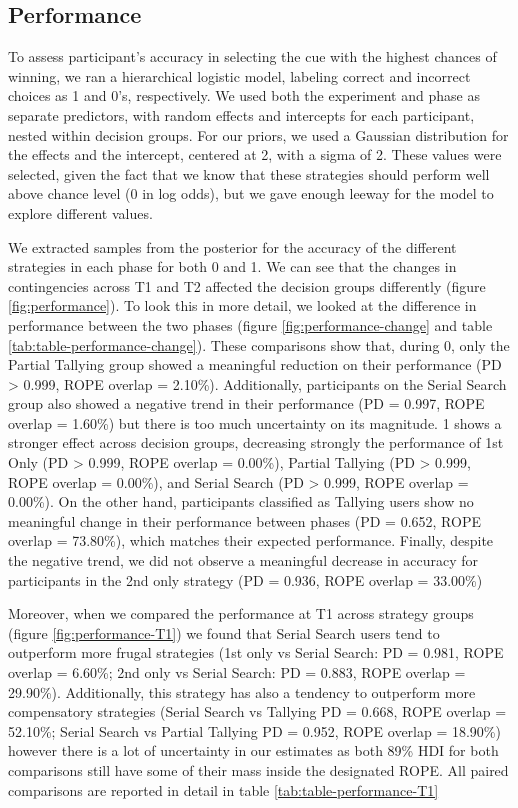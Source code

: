 \documentclass[
  english,
  man]{apa6}
\begin{document}
\hypertarget{performance}{%
\subsection{Performance}\label{performance}}

To assess participant's accuracy in selecting the cue with the highest chances of winning, we ran a hierarchical logistic model, labeling correct and incorrect choices as 1 and 0's, respectively. We used both the experiment and phase as separate predictors, with random effects and intercepts for each participant, nested within decision groups. For our priors, we used a Gaussian distribution for the effects and the intercept, centered at 2, with a sigma of 2. These values were selected, given the fact that we know that these strategies should perform well above chance level (0 in log odds), but we gave enough leeway for the model to explore different values.

We extracted samples from the posterior for the accuracy of the different strategies in each phase for both 0 and 1. We can see that the changes in contingencies across T1 and T2 affected the decision groups differently (figure \ref{fig:performance}). To look this in more detail, we looked at the difference in performance between the two phases (figure \ref{fig:performance-change} and table \ref{tab:table-performance-change}). These comparisons show that, during 0, only the Partial Tallying group showed a meaningful reduction on their performance (PD \textgreater{} 0.999, ROPE overlap = 2.10\%). Additionally, participants on the Serial Search group also showed a negative trend in their performance (PD = 0.997, ROPE overlap = 1.60\%) but there is too much uncertainty on its magnitude. 1 shows a stronger effect across decision groups, decreasing strongly the performance of 1st Only (PD \textgreater{} 0.999, ROPE overlap = 0.00\%), Partial Tallying (PD \textgreater{} 0.999, ROPE overlap = 0.00\%), and Serial Search (PD \textgreater{} 0.999, ROPE overlap = 0.00\%). On the other hand, participants classified as Tallying users show no meaningful change in their performance between phases (PD = 0.652, ROPE overlap = 73.80\%), which matches their expected performance. Finally, despite the negative trend, we did not observe a meaningful decrease in accuracy for participants in the 2nd only strategy (PD = 0.936, ROPE overlap = 33.00\%)

Moreover, when we compared the performance at T1 across strategy groups (figure \ref{fig:performance-T1}) we found that Serial Search users tend to outperform more frugal strategies (1st only vs Serial Search: PD = 0.981, ROPE overlap = 6.60\%; 2nd only vs Serial Search: PD = 0.883, ROPE overlap = 29.90\%). Additionally, this strategy has also a tendency to outperform more compensatory strategies (Serial Search vs Tallying PD = 0.668, ROPE overlap = 52.10\%; Serial Search vs Partial Tallying PD = 0.952, ROPE overlap = 18.90\%) however there is a lot of uncertainty in our estimates as both 89\% HDI for both comparisons still have some of their mass inside the designated ROPE. All paired comparisons are reported in detail in table \ref{tab:table-performance-T1}
\end{document}
